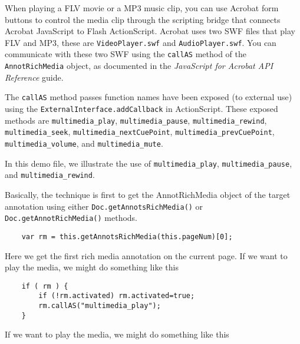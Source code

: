 \documentclass{article}
\begin{document}
\maketitle


When playing a FLV movie or a MP3 music clip, you can use Acrobat
form buttons to control the media clip through the scripting bridge
that connects Acrobat JavaScript to Flash ActionScript. Acrobat uses
two SWF files that play FLV and MP3, these are
\texttt{VideoPlayer.swf} and \texttt{AudioPlayer.swf}.  You can
communicate with these two SWF using the \texttt{callAS} method of
the \texttt{AnnotRichMedia} object, as documented in the
\textsl{JavaScript for Acrobat API Reference} guide.

The \texttt{callAS} method passes function names have been exposed
(to external use) using the \texttt{ExternalInterface.addCallback}
in ActionScript. These exposed methods are
\texttt{multimedia\_play}, \texttt{multimedia\_pause},
\texttt{multimedia\_rewind}, \texttt{multimedia\_seek},
\texttt{multimedia\_nextCuePoint},
\texttt{multimedia\_prevCuePoint}, \texttt{multimedia\_volume}, and \texttt{multimedia\_mute}.

In this demo file, we illustrate the use of
\texttt{multimedia\_play}, \texttt{multimedia\_pause}, and \texttt{multimedia\_rewind}.

Basically, the technique is first to get the AnnotRichMedia object of the target annotation
using either \texttt{Doc.getAnnotsRichMedia()} or \texttt{Doc.getAnnotRichMedia()} methods.
\begin{verbatim}
    var rm = this.getAnnotsRichMedia(this.pageNum)[0];
\end{verbatim}
Here we get the first rich media annotation on the current page.
If we want to play the media, we might do something like this
\begin{verbatim}
    if ( rm ) {
        if (!rm.activated) rm.activated=true;
        rm.callAS("multimedia_play");
    }
\end{verbatim}
If we want to play the media, we might do something like this
\end{document}
